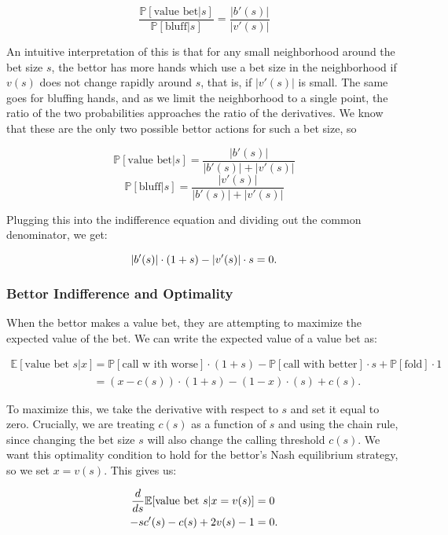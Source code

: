 \documentclass[../../main/main.tex]{subfiles}
\begin{document}
\[ \frac{\mathbb{P}[\text{value bet} | s]}{\mathbb{P}[\text{bluff} | s]} = \frac{|b'(s)|}{|v'(s)|}\]

An intuitive interpretation of this is that for any small neighborhood around the bet size $s$, the bettor has more hands which use a bet size in the neighborhood if $v(s)$ does not change rapidly around $s$, that is, if $|v'(s)|$ is small. The same goes for bluffing hands, and as we limit the neighborhood to a single point, the ratio of the two probabilities approaches the ratio of the derivatives. We know that these are the only two possible bettor actions for such a bet size, so

\[ \mathbb{P}[\text{value bet} | s] = \frac{|b'(s)|}{|b'(s)| + |v'(s)|} \]
\[ \mathbb{P}[\text{bluff} | s] = \frac{|v'(s)|}{|b'(s)| + |v'(s)|} \]

Plugging this into the indifference equation and dividing out the common denominator, we get:

\begin{equation}{\label{callindiff}}
    |b'(s)| \cdot (1 + s) - |v'(s)| \cdot s = 0.
\end{equation}



\subsubsection{Bettor Indifference and Optimality}

When the bettor makes a value bet, they are attempting to maximize the expected value of the bet. We can write the expected value of a value bet as:

\begin{align*}
    \mathbb{E}[\text{value bet } s | x] & = \mathbb{P}[\text{call w ith worse}] \cdot (1+s) - \mathbb{P}[\text{call with better}] \cdot s + \mathbb{P}[\text{fold}] \cdot 1 \\
    & = (x-c(s)) \cdot (1+s) - (1-x) \cdot (s) + c(s).
\end{align*}

To maximize this, we take the derivative with respect to $s$ and set it equal to zero. Crucially, we are treating $c(s)$ as a function of $s$ and using the chain rule, since changing the bet size $s$ will also change the calling threshold $c(s)$. We want this optimality condition to hold for the bettor's Nash equilibrium strategy, so we set $x=v(s)$. This gives us:

\begin{align}{\label{valueoptimality}}
    \nonumber \frac{d}{ds} \mathbb{E}[\text{value bet } s | x=v(s)] & = 0 \\
    -sc'(s) - c(s) + 2 v(s) - 1 & = 0.
\end{align}
\end{document}
